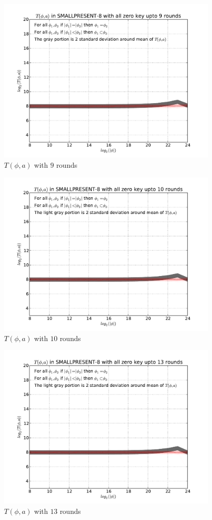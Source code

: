 \documentclass[9pt]{article}
\begin{document}
\begin{figure}[h!]
    \centering
    \includegraphics[width=\textwidth , height = 8cm]{T_a_phi_variable_a_varible_phi_variable_size_09rounds}
    \caption{$T(\phi,a)$ with $9$ rounds}
    \label{fig:T_a_phi_variable_a_varible_phi_variable_size_09rounds}
\end{figure}

\begin{figure}[h!]
    \centering
    \includegraphics[width=\textwidth , height = 8cm]{T_a_phi_variable_a_varible_phi_variable_size_10rounds}
    \caption{$T(\phi,a)$ with $10$ rounds}
    \label{fig:T_a_phi_variable_a_varible_phi_variable_size_10rounds}
\end{figure}

\begin{figure}[h!]
    \centering
    \includegraphics[width=\textwidth , height = 8cm]{T_a_phi_variable_a_varible_phi_variable_size_13rounds}
    \caption{$T(\phi,a)$ with $13$ rounds}
    \label{fig:T_a_phi_variable_a_varible_phi_variable_size_13rounds}
\end{figure}
\end{document}
